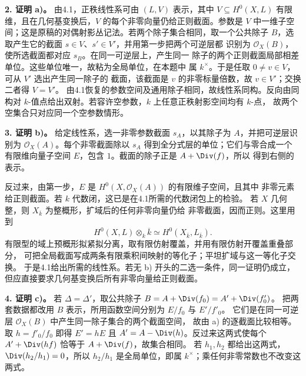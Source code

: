 \documentclass[UTF8,a4paper]{ctexbook}
\newcommand{\OO}{\mathscr O}
\begin{document}
\medskip\noindent\textbf{2. 证明 a)。}
由4.1，正秩线性系可由 \((L,V)\) 表示，其中 \(V\subseteq H^0(X,L)\)
有限维，且在几何基变换后，\(V\) 的每个非零向量仍给正则截面。参数是 \(V\)
中一维子空间；这是原稿的对偶射影丛记法。若两个除子集合相同，取一个公共除子
\(B\)，选取产生它的截面 \(s\in V\)、\(s'\in V'\)，并用第一步把两个可逆层都
识别为 \(\OO_X(B)\)，使所选截面都对应 \(s_B\)。在同一可逆层上，产生同一
除子的两个正则截面局部相差单位。这些单位唯一，故粘为全局单位，在本题中
属 \(k^\times\)。于是任取 \(0\ne v\in V\)，可从 \(V'\) 选出产生同一除子的
截面，该截面是 \(v\) 的非零标量倍数，故 \(v\in V'\)；交换二者得 \(V=V'\)。
由4.1恢复的参数空间及通用除子相同，故线性系同构。反向由同构对
\(k\)-值点给出双射。若容许空参数，\(k\) 上任意正秩射影空间均有 \(k\)-点，
故两个空集合只对应同一个空参数情形。

\medskip\noindent\textbf{3. 证明 b)。}
给定线性系，选一非零参数截面 \(s_A\)，以其除子为 \(A\)，并把可逆层识别为
\(\OO_X(A)\)。每个非零截面除以 \(s_A\) 得到全分式层的单位；它们与零合成一个
有限维向量子空间 \(E\)，包含 \(1\)。截面的除子正是 \(A+\Div(f)\)，所以
得到右侧的表示。

反过来，由第一步，\(E\) 是 \(H^0(X,\OO_X(A))\) 的有限维子空间，且其中
非零元素给正则截面。若 \(k\) 代数闭，这已是在4.1所需的代数闭包上的检验。
若 \(X\) 几何整，则 \(X_{\overline k}\) 为整概形，扩域后的任何非零向量仍给
非零截面，因而正则。这里用到
\[
 H^0(X,L)\otimes_k\overline k\simeq H^0(X_{\overline k},L_{\overline k}).
\]
有限型的域上预概形拟紧拟分离，取有限仿射覆盖，并用有限仿射开覆盖重叠部分，
可把全局截面写成两条有限乘积间映射的等化子；平坦扩域与这一等化子交换。
于是4.1给出所需的线性系。若无 b) 开头的二选一条件，同一证明仍成立，
但应直接要求几何基变换后所有非零向量给正则截面。

\medskip\noindent\textbf{4. 证明 c)。}
若 \(\Delta=\Delta'\)，取公共除子 \(B=A+\Div(f_0)=A'+\Div(f'_0)\)。
把两套数据都改用 \(B\) 表示，所用函数空间分别为 \(E/f_0\) 与 \(E'/f'_0\)。
它们是在同一可逆层 \(\OO_X(B)\) 中产生同一除子集合的两个截面空间，
故由 a) 的逐截面比较相等。取 \(h=f'_0/f_0\) 即得
\(E'=hE\) 且 \(A'=A-\Div(h)\)。反过来这两式使每个
\(A'+\Div(hf)\) 恰等于 \(A+\Div(f)\)，故集合相同。
若 \(h_1,h_2\) 都给出这两式，\(\Div(h_2/h_1)=0\)，所以
\(h_2/h_1\) 是全局单位，即属 \(k^\times\)；乘任何非零常数也不改变这两式。
\par\endgroup
\end{document}
